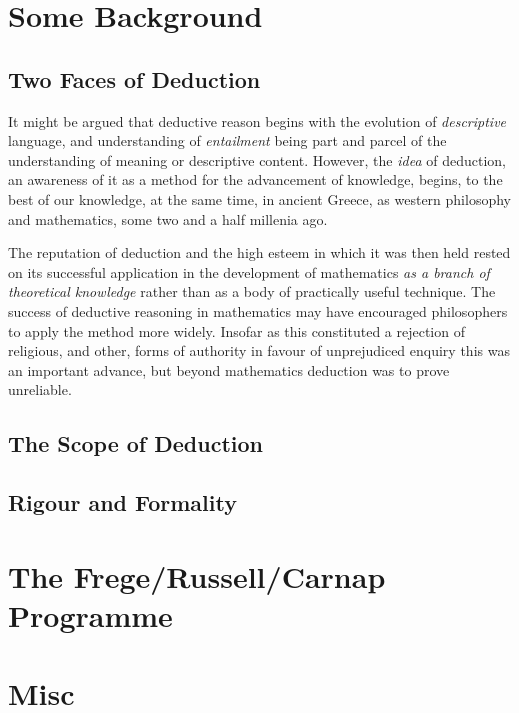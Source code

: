 \chapter{Some Background}

\section{Two Faces of Deduction}

It might be argued that deductive reason begins with the evolution of \emph{descriptive} language, and understanding of \emph{entailment} being part and parcel of the understanding of meaning or descriptive content.
However, the \emph{idea} of deduction, an awareness of it as a method for the advancement of knowledge, begins, to the best of our knowledge, at the same time, in ancient Greece, as western philosophy and mathematics, some two and a half millenia ago.

The reputation of deduction and the high esteem in which it was then held rested on its successful application in the development of mathematics \emph{as a branch of theoretical knowledge} rather than as a body of practically useful technique.
The success of deductive reasoning in mathematics may have encouraged philosophers to apply the method more widely.
Insofar as this constituted a rejection of religious, and other, forms of authority in favour of unprejudiced enquiry this was an important advance, but beyond mathematics deduction was to prove unreliable.


\section{The Scope of Deduction}

\section{Rigour and Formality}


\chapter{The Frege/Russell/Carnap Programme}

\section{}


\appendix

\chapter{Misc}

